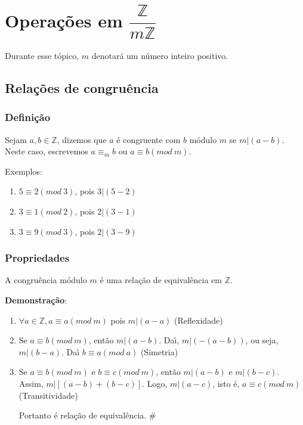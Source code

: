 \chapter{Opera{\c c}{\~o}es em $\dfrac{\mathbb{Z}}{m\mathbb{Z}}$}

Durante esse t{\'o}pico, $m$ denotar{\'a} um n{\'u}mero inteiro positivo.

\section{Rela{\c c}{\~o}es de congru{\^e}ncia}
\subsection{Defini{\c c}{\~a}o}

\begin{definicao} Sejam $a,b\in\mathbb{Z}$, dizemos que $a$ {\'e} congruente com $b$ m{\'o}dulo $m$ se $m|(a-b)$. Neste caso, escrevemos $a\equiv_{m}b$ ou $a\equiv b(mod\ m)$.\end{definicao}

Exemplos:
\begin{enumerate}
\item $5\equiv 2(mod\ 3)$, pois $3|(5-2)$
\item $3\equiv 1(mod\ 2)$, pois $2|(3-1)$
\item $3\equiv 9(mod\ 3)$, pois $2|(3-9)$

\end{enumerate}
\subsection{Propriedades}
\begin{proposicao} A congru{\^e}ncia m{\'o}dulo $m$ {\'e} uma rela{\c c}{\~a}o de equival{\^e}ncia em $\mathbb{Z}$.\end{proposicao}

\textbf{Demonstra{\c c}{\~a}o}: 
\begin{enumerate}
\item $\forall a\in\mathbb{Z},a\equiv a(mod\ m)$ pois $m|(a-a)$ (Reflexidade)
\item Se $a\equiv b(mod\ m)$, ent{\~a}o $m|(a-b)$. Da{\'\i}, $m|(-(a-b))$, ou seja, $m|(b-a)$. Da{\'\i} $b\equiv a(mod\ a)$ (Simetria)
\item Se $a\equiv b(mod\ m)$ e $b\equiv c(mod\ m)$, ent{\~a}o $m|(a-b)$ e $m|(b-c)$. Assim, $m|[(a-b)+(b-c)]$. Logo, $m|(a-c)$, isto {\'e}, $a\equiv c(mod\ m)$ (Transitividade)

Portanto {\'e} rela{\c c}{\~a}o de equival{\^e}ncia. \#

\end{enumerate}

